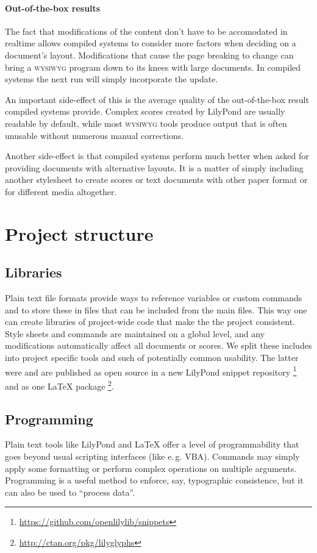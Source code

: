 \documentclass[11pt,a4paper]{article}
\begin{document}
\paragraph{Out-of-the-box results}
The fact that modifications of the content don't have to be accomodated in realtime
allows compiled systems to consider more factors when deciding on a document's layout.
Modifications that cause the page breaking to change can bring a
\textsc{wysiwyg} program down to its knees with large documents. In compiled systems the
next run will simply incorporate the update.

An important side-effect of this is the average quality of the out-of-the-box result
compiled systems provide. Complex scores created by LilyPond are usually readable by
default, while most \textsc{wysiwyg} tools produce output that is often unusable without
numerous manual corrections.

Another side-effect is that compiled systems perform much better when asked for providing
documents with alternative layouts. It is a matter of simply including another stylesheet
to create scores or text documents with other paper format or for different media altogether.

\section{Project structure}

\subsection{Libraries}
Plain text file formats provide ways to reference variables or custom
commands and to store these in files that can be included from the
main files. This way one can create libraries of project-wide code
that make the the project consistent. Style sheets and commands are
maintained on a global level, and any modifications automatically
affect all documents or scores.
We split these includes into project specific tools and such of potentially
common usability. The latter were and are published as open source in a new 
LilyPond snippet repository%
\footnote{\url{https://github.com/openlilylib/snippets}}
and as one \LaTeX{} package%
\footnote{\url{http://ctan.org/pkg/lilyglyphs}}.

\subsection{Programming}
Plain text tools like LilyPond and \LaTeX{} offer a level of programmability that
goes beyond usual scripting interfaces (like e.\,g. VBA). Commands may simply apply
some formatting or perform complex operations on multiple arguments.
Programming is a useful method to enforce, say, typographic consistence, but it can
also be used to “process data”.
\end{document}
